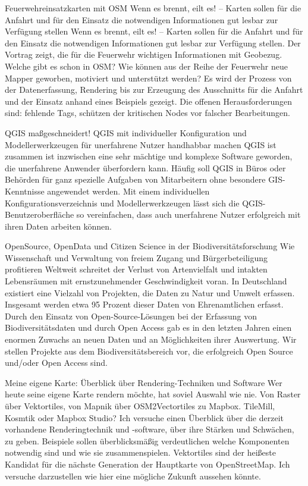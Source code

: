 %
{Feuerwehreinsatzkarten mit OSM}%
{Wenn es brennt, eilt es! – Karten sollen für die Anfahrt und für den Einsatz die notwendigen
Informationen gut lesbar zur Verfügung stellen}%
{Wenn es brennt, eilt es! -- Karten sollen für die
  Anfahrt und für den Einsatz die notwendigen Informationen gut lesbar zur Verfügung stellen.
Der Vortrag zeigt, die für die Feuerwehr wichtigen Informationen mit Geobezug. Welche gibt es schon
in OSM? Wie können aus der Reihe der Feuerwehr neue Mapper geworben, motiviert und unterstützt
werden?  Es wird der Prozess von der Datenerfassung, Rendering bis zur Erzeugung des Ausschnitts für
die
Anfahrt und der Einsatz anhand eines Beispiels gezeigt. Die offenen Herausforderungen sind: fehlende
Tags, schützen der kritischen Nodes vor falscher Bearbeitungen.}

%
{QGIS maßgeschneidert!}%
{QGIS mit individueller Konfiguration und Modellerwerkzeugen für unerfahrene Nutzer handhabbar machen}%
{QGIS ist zusammen ist inzwischen eine sehr mächtige und komplexe Software geworden, die unerfahrene
  Anwender überfordern kann.  Häufig soll QGIS in Büros oder Behörden für ganz spezielle Aufgaben
  von Mitarbeitern ohne besondere
GIS-Kenntnisse angewendet werden.  Mit einem individuellen Konfigurationsverzeichnis und
Modellerwerkzeugen lässt sich die QGIS-Benutzeroberfläche so vereinfachen, dass auch unerfahrene
Nutzer erfolgreich mit ihren Daten arbeiten können. 
}

%
{OpenSource, OpenData und Citizen Science in der Biodiversitätsforschung}%
{Wie Wissenschaft und Verwaltung von freiem Zugang und Bürgerbeteiligung profitieren}%
{Weltweit schreitet der Verlust von Artenvielfalt und intakten Lebensräumen mit ernstzunehmender
Geschwindigkeit voran. In Deutschland existiert eine Vielzahl von Projekten, die Daten zu Natur und
Umwelt erfassen. Insgesamt werden etwa 95 Prozent dieser Daten von Ehrenamtlichen erfasst.  Durch
den Einsatz von Open-Source-Lösungen bei der Erfassung von Biodiversitätsdaten und durch Open Access
gab es in den letzten Jahren einen enormen Zuwachs an neuen Daten und an Möglichkeiten ihrer
Auswertung. Wir stellen Projekte aus dem Biodiversitätsbereich vor, die erfolgreich Open Source
und/oder Open Access sind.}

%
{Meine eigene Karte: Überblick über Rendering-Techniken und Software}%
{}%
{Wer heute seine eigene Karte rendern möchte, hat soviel Auswahl wie nie. Von Raster über
Vektortiles, von Mapnik über OSM2Vectortiles zu Mapbox. TileMill, Kosmtik oder Mapbox Studio? Ich
versuche einen Überblick über die derzeit vorhandene Renderingtechnik und -software, über ihre
Stärken und Schwächen, zu geben. Beispiele sollen überblicksmäßig verdeutlichen welche Komponenten
notwendig sind und wie sie zusammenspielen. Vektortiles sind der heißeste Kandidat für die nächste
Generation der Hauptkarte von OpenStreetMap. Ich versuche darzustellen wie hier eine mögliche
Zukunft aussehen könnte.}


